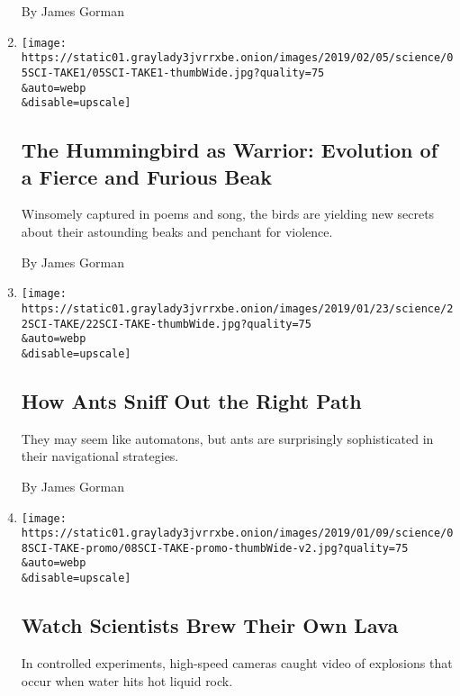 \begin{enumerate}
  By James Gorman
\item
  \href{/2019/02/05/science/hummingbirds-science-take.html}{}

  \texttt{[image: https://static01.graylady3jvrrxbe.onion/images/2019/02/05/science/05SCI-TAKE1/05SCI-TAKE1-thumbWide.jpg?quality=75\\\&auto=webp\\\&disable=upscale]}

  \hypertarget{the-hummingbird-as-warrior-evolution-of-a-fierce-and-furious-beak}{%
  \subsection{The Hummingbird as Warrior: Evolution of a Fierce and
  Furious
  Beak}\label{the-hummingbird-as-warrior-evolution-of-a-fierce-and-furious-beak}}

  Winsomely captured in poems and song, the birds are yielding new
  secrets about their astounding beaks and penchant for violence.

  By James Gorman
\item
  \href{/2019/01/22/science/ants-navigate-scent.html}{}

  \texttt{[image: https://static01.graylady3jvrrxbe.onion/images/2019/01/23/science/22SCI-TAKE/22SCI-TAKE-thumbWide.jpg?quality=75\\\&auto=webp\\\&disable=upscale]}

  \hypertarget{how-ants-sniff-out-the-right-path}{%
  \subsection{How Ants Sniff Out the Right
  Path}\label{how-ants-sniff-out-the-right-path}}

  They may seem like automatons, but ants are surprisingly sophisticated
  in their navigational strategies.

  By James Gorman
\item
  \href{/2019/01/08/science/volcanos-explosions-lava.html}{}

  \texttt{[image: https://static01.graylady3jvrrxbe.onion/images/2019/01/09/science/08SCI-TAKE-promo/08SCI-TAKE-promo-thumbWide-v2.jpg?quality=75\\\&auto=webp\\\&disable=upscale]}

  \hypertarget{watch-scientists-brew-their-own-lava}{%
  \subsection{Watch Scientists Brew Their Own
  Lava}\label{watch-scientists-brew-their-own-lava}}

  In controlled experiments, high-speed cameras caught video of
  explosions that occur when water hits hot liquid rock.


\end{enumerate}
